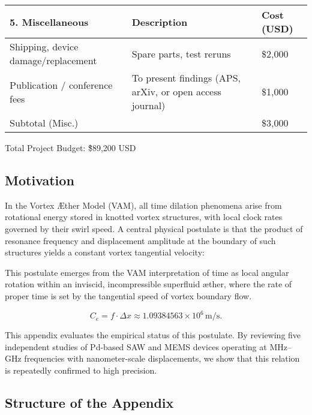 \begin{table}
    \centering
    \footnotesize
    \begin{tabular}{lll}
        \toprule
        \textbf{5. Miscellaneous} & \textbf{Description} & \textbf{Cost (USD)} \\
        \midrule
        Shipping, device damage/replacement & Spare parts, test reruns & \$2,000 \\
        Publication / conference fees & To present findings (APS, arXiv, or open access journal) & \$1,000 \\
        Subtotal (Misc.) &  & \$3,000 \\
        \bottomrule
    \end{tabular}
    \caption{}
    \label{tab:misc}
\end{table}

Total Project Budget: \~\$89,200 USD



    \subsection*{Motivation}

    In the Vortex \AE{}ther Model (VAM), all time dilation phenomena arise from rotational energy stored in knotted vortex structures, with local clock rates governed by their swirl speed. A central physical postulate is that the product of resonance frequency and displacement amplitude at the boundary of such structures yields a constant vortex tangential velocity:

    This postulate emerges from the VAM interpretation of time as local angular rotation within an inviscid, incompressible superfluid \ae{}ther, where the rate of proper time is set by the tangential speed of vortex boundary flow.

    \[
        \boxed{C_e = f \cdot \Delta x \approx 1.09384563 \times 10^6 \, \text{m/s}}.
    \]

    This appendix evaluates the empirical status of this postulate. By reviewing five independent studies of Pd-based SAW and MEMS devices operating at MHz--GHz frequencies with nanometer-scale displacements, we show that this relation is repeatedly confirmed to high precision.

    \subsection*{Structure of the Appendix}

